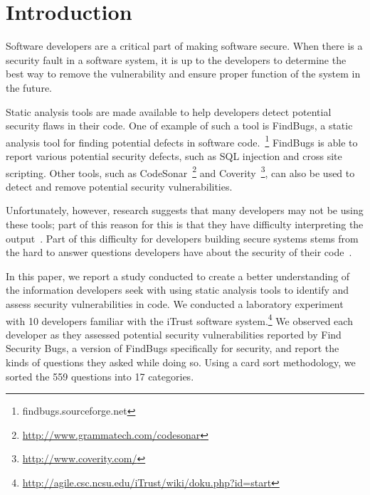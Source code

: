 \documentclass[conference]{IEEEtran}
\begin{document}
%
\IEEEpeerreviewmaketitle



\section{Introduction}


Software developers are a critical part of making software secure. 
When there is a security fault in a software system, it is up to the developers to determine the best way to remove the vulnerability and ensure proper function of the system in the future.

Static analysis tools are made available to help developers detect potential security flaws in their code. One of example of such a tool is FindBugs, a static analysis tool for finding potential defects in software code.~\footnote{findbugs.sourceforge.net} FindBugs is able to report various potential security defects, such as SQL injection and cross site scripting.  %
Other tools, such as CodeSonar~\footnote{\url{http://www.grammatech.com/codesonar}} and Coverity~\footnote{\url{http://www.coverity.com/}}, can also be used to detect and remove potential security vulnerabilities.

Unfortunately, however, research suggests that many developers may not be using these tools; part of this reason for this is that they have difficulty interpreting the output~\cite{johnson2013don}. 
Part of this difficulty for developers building secure systems stems from the hard to answer questions developers have about the security of their code~\cite{latoza2010hard}.

In this paper, we report a study conducted to create a better understanding of the information developers seek with using static analysis tools to identify and assess security vulnerabilities in code.
We conducted a laboratory experiment with 10 developers familiar with the iTrust software system.\footnote{\url{http://agile.csc.ncsu.edu/iTrust/wiki/doku.php?id=start}} 
We observed each developer as they assessed potential security vulnerabilities reported by Find Security Bugs, a version of FindBugs specifically for security, and report the kinds of questions they asked while doing so.
Using a card sort methodology, we sorted the 559 questions into 17 categories. 
\end{document}
